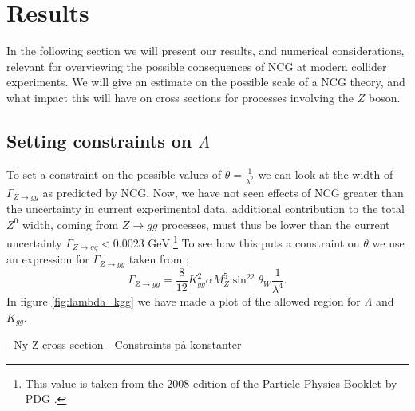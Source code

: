 \section{Results}
In the following section we will present our results, and numerical considerations, relevant for overviewing the possible consequences of NCG at modern collider experiments. We will give an estimate on the possible scale of a NCG theory, and what impact this will have on cross sections for processes involving the $Z$ boson.

\subsection{Setting constraints on $\Lambda$}
To set a constraint on the possible values of $\theta = \frac{1}{\lambda^2}$ we can look at the width of $\Gamma_{Z \rightarrow gg}$ as predicted by NCG. Now, we have not seen effects of NCG greater than the uncertainty in current experimental data, additional contribution to the total $Z^0$ width, coming from $Z \rightarrow gg$ processes, must thus be lower than the current uncertainty $\Gamma_{Z \rightarrow gg} < 0.0023 \textrm{ GeV}$.\footnote{This value is taken from the 2008 edition of the Particle Physics Booklet by PDG \cite{amsler2008rpp}.} To see how this puts a constraint on $\theta$ we use an expression for $\Gamma_{Z \rightarrow gg}$ taken from \cite{behr2003dnc};
\begin{equation} \label{eq:zggwidth}
	\Gamma_{Z \rightarrow gg} = \frac{8}{12} K_{gg}^2 \alpha M_Z^5 \sin^22\theta_W \frac{1}{\lambda^4}.
\end{equation}
In figure \ref{fig:lambda_kgg} we have made a plot of the allowed region for $\Lambda$ and $K_{gg}$.

- Ny Z cross-section
- Constraints på konstanter

